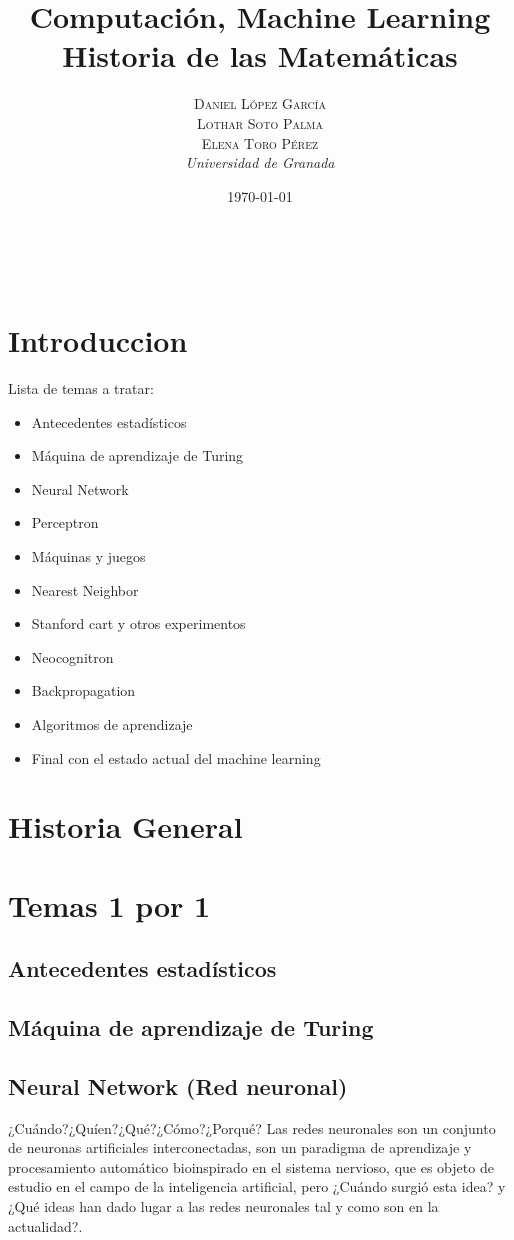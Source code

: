 \documentclass[a4paper, 11pt]{article} %
\title{\textbf{Computación, Machine Learning}\\ %
\vspace{20 pt}
Historia de las Matemáticas} %
\author{\textsc{Daniel López García\\
Lothar Soto Palma\\
Elena Toro Pérez} %
\\{\textit{Universidad de Granada}}} %
\date{\today} %
\makeatletter
\renewcommand{\maketitle}{ %
\begin{center} %
{\Huge\@title} %
\end{center}

\vspace{20pt} %

\begin{flushright} %
{\large\@author} %
\\\@date %

\vspace{40pt} %
\end{flushright}
\renewcommand{\baselinestretch}{0.5}

}
\makeatother
\begin{document}
	\maketitle
	\tableofcontents
	\listoffigures

\section{Introduccion}
		Lista de temas a tratar:
		\begin{itemize}
			\item Antecedentes estadísticos
			\item Máquina de aprendizaje de Turing
			\item Neural Network
			\item Perceptron
			\item Máquinas y juegos
			\item Nearest Neighbor
			\item Stanford cart y otros experimentos
			\item Neocognitron
			\item Backpropagation
			\item Algoritmos de aprendizaje
			\item Final con el estado actual del machine learning
		\end{itemize}
\section{Historia General}
\section{Temas 1 por 1}
\subsection{Antecedentes estadísticos}
\subsection{Máquina de aprendizaje de Turing}
\subsection{Neural Network (Red neuronal)}
¿Cuándo?¿Quíen?¿Qué?¿Cómo?¿Porqué?
Las redes neuronales son un conjunto de neuronas artificiales interconectadas, son un paradigma de aprendizaje y procesamiento automático bioinspirado en el sistema nervioso, que es objeto de estudio en el campo de la inteligencia artificial, pero ¿Cuándo surgió esta idea? y ¿Qué ideas han dado lugar a las redes neuronales tal y como son en la actualidad?.
\end{document}
